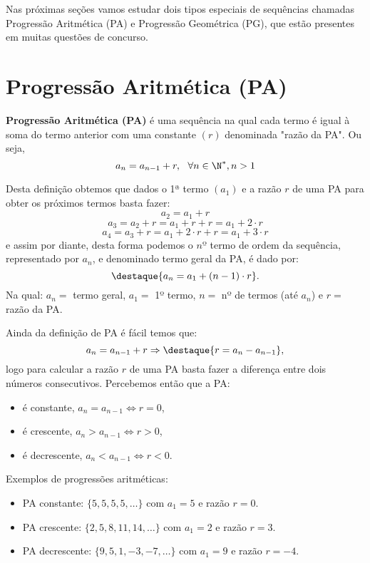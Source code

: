  Nas próximas seções vamos estudar dois tipos especiais de sequências chamadas Progressão Aritmética (PA) e Progressão Geométrica (PG), que estão presentes em muitas questões de concurso.

\section{Progressão Aritmética (PA)}

 \colorbox{azul}{
 \begin{minipage}{0.9\linewidth}
 \begin{center}
  \textbf{Progressão Aritmética (PA)} é uma sequência na qual cada termo é igual à soma do termo anterior com uma constante $(r)$ denominada "razão da PA". Ou seja,
  \[a_{n}= a_{n-1} + r, \ \ \forall n \in \N^{\ast}, n > 1\]
 \end{center}
 \end{minipage}}
 \vskip0.3cm

 Desta definição obtemos que dados o 1ª termo $(a_1)$ e a razão $r$ de uma PA para obter os próximos termos basta fazer:
 \[a_2= a_1 + r\]
 \[a_3= a_2 + r= a_1 + r + r= a_1 + 2 \cdot r\]
 \[a_4= a_3 + r= a_1 + 2 \cdot r + r= a_1 + 3 \cdot r\]
 e assim por diante, desta forma podemos o $nº$ termo de ordem da sequência, representado por $a_n$, e denominado termo geral da PA, é dado por:
 \[\destaque{a_n= a_1 + (n-1) \cdot r} .\]
 Na qual: $a_n=$ termo geral, $a_1=$ 1º termo, $n=$ nº de termos (até $a_n$) e $r=$ razão da PA.

 Ainda da definição de PA é fácil temos que:
 \[a_{n}= a_{n-1} + r \Rightarrow
 \destaque{r= a_{n} - a_{n-1}} ,\]
 logo para calcular a razão $r$ de uma PA basta fazer a diferença entre dois números consecutivos. Percebemos então que a PA:
 \begin{itemize}
  \item é constante, $a_n= a_{n-1} \Leftrightarrow r= 0$,
  \item é crescente, $a_n > a_{n-1} \Leftrightarrow r > 0$,
  \item é decrescente, $a_n < a_{n-1} \Leftrightarrow r < 0$.
 \end{itemize}

 \begin{exem} Exemplos de progressões aritméticas:
  \begin{itemize}
   \item PA constante: $\{5, 5, 5, 5, \ldots \}$ com $a_1= 5$ e razão $r= 0$.
   \item PA crescente: $\{2, 5, 8, 11, 14, \ldots \}$ com $a_1= 2$ e razão $r= 3$.
   \item PA decrescente: $\{9, 5, 1, -3, -7, \ldots \}$ com $a_1= 9$ e razão $r= -4$.
  \end{itemize}
 \end{exem}

